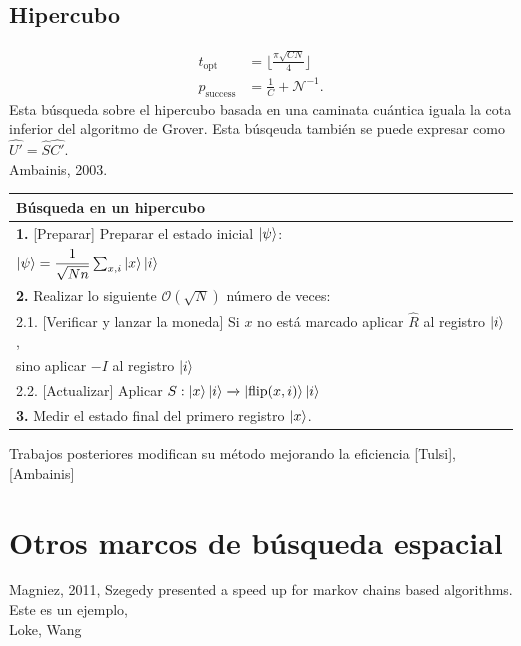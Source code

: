 \subsection{Hipercubo}

\begin{align}
    t_{\text{opt}}&=\lfloor\frac{\pi \sqrt{CN}}{4}\rfloor\\
    p_{\text{success}}&=\frac{1}{C}+\mathcal{N^{-1}}.
\end{align}
Esta búsqueda sobre el hipercubo basada en una caminata cuántica iguala la cota inferior del algoritmo de Grover.
Esta búsqeuda también se puede expresar como $\hat{U'}=\hat{S}\hat{C'}$.\\
\cite{shenvi2003quantum} \cite{ambainis2003quantum} Ambainis, 2003.
\begin{center}
    \begin{tabular}{|l|}
    \hline \textbf{Búsqueda en un hipercubo} \\\hline 
    \textbf{1.} [Preparar] Preparar el estado inicial $\ket{\psi}$:\\ $\ket{\psi}=\dfrac{1}{\sqrt{Nn}}\sum_{x,i}\ket{x}\ket{i}$\\
    \textbf{2.} Realizar lo siguiente $\mathcal{O}(\sqrt{N})$ número de veces:\\
    2.1. [Verificar y lanzar la moneda] Si $x$ no está marcado aplicar $\hat{R}$ al registro $\ket{i}$,\\
    sino aplicar $-I$ al registro $\ket{i}$\\
    2.2. [Actualizar] Aplicar $S:\ket{x}\ket{i}\xrightarrow{}\ket{\text{flip}(x,i)}\ket{i}$\\
    \textbf{3.} Medir el estado final del primero registro $\ket{x}$.\\\hline
    \end{tabular}{}
\end{center}{}



Trabajos posteriores modifican su método mejorando la eficiencia [Tulsi], [Ambainis]

\section{Otros marcos de búsqueda espacial}
\cite{magniez2011search} Magniez, 2011,
\cite{szegedy2004quantum} Szegedy presented a speed up for markov chains based algorithms. \\
Este es un ejemplo, \\
Loke, Wang\\

